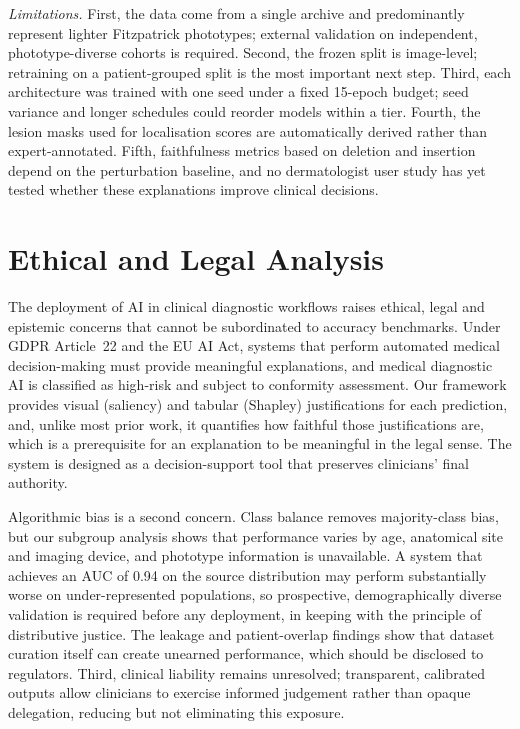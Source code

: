 \documentclass[journal]{IEEEtran}
\begin{document}
\textit{Limitations.} First, the data come from a single archive and predominantly represent lighter Fitzpatrick phototypes; external validation on independent, phototype-diverse cohorts is required. Second, the frozen split is image-level; retraining on a patient-grouped split is the most important next step. Third, each architecture was trained with one seed under a fixed 15-epoch budget; seed variance and longer schedules could reorder models within a tier. Fourth, the lesion masks used for localisation scores are automatically derived rather than expert-annotated. Fifth, faithfulness metrics based on deletion and insertion depend on the perturbation baseline, and no dermatologist user study has yet tested whether these explanations improve clinical decisions.

\section{Ethical and Legal Analysis}
The deployment of AI in clinical diagnostic workflows raises ethical, legal and epistemic concerns that cannot be subordinated to accuracy benchmarks. Under GDPR Article~22 and the EU AI Act, systems that perform automated medical decision-making must provide meaningful explanations, and medical diagnostic AI is classified as high-risk and subject to conformity assessment. Our framework provides visual (saliency) and tabular (Shapley) justifications for each prediction, and, unlike most prior work, it quantifies how faithful those justifications are, which is a prerequisite for an explanation to be meaningful in the legal sense. The system is designed as a decision-support tool that preserves clinicians' final authority.

Algorithmic bias is a second concern. Class balance removes majority-class bias, but our subgroup analysis shows that performance varies by age, anatomical site and imaging device, and phototype information is unavailable. A system that achieves an AUC of 0.94 on the source distribution may perform substantially worse on under-represented populations, so prospective, demographically diverse validation is required before any deployment, in keeping with the principle of distributive justice. The leakage and patient-overlap findings show that dataset curation itself can create unearned performance, which should be disclosed to regulators. Third, clinical liability remains unresolved; transparent, calibrated outputs allow clinicians to exercise informed judgement rather than opaque delegation, reducing but not eliminating this exposure.
\end{document}
